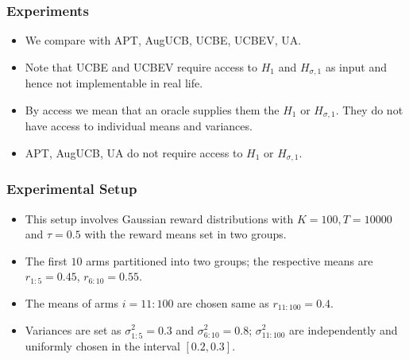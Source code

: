 
\begin{frame}
\frametitle{Experiments}
\begin{itemize}
\item<1-> We compare with APT, AugUCB, UCBE, UCBEV, UA.
\item<2-> Note that UCBE and UCBEV require access to $H_1$ and $H_{\sigma, 1}$ as input and hence not implementable in real life. 
\item<2-> By access we mean that an oracle supplies them the $H_1$ or $H_{\sigma, 1}$. They do not have access to individual means and variances.
\item<3-> APT, AugUCB, UA do not require access to $H_1$ or $H_{\sigma, 1}$.
\end{itemize}
\end{frame}

\begin{frame}
\frametitle{Experimental Setup}
\begin{itemize}
\item<1-> This setup involves Gaussian reward distributions with $K=100, T=10000$ and $\tau=0.5$ with the reward means set in two groups.
\item<2-> The first $10$ arms partitioned into two groups; the respective means are $r_{1:5}=0.45$, $r_{6:10}=0.55$.
\item<3-> The means of arms $i=11:100$ are chosen same as $r_{11:100}=0.4$.
\item<3-> Variances are set as $\sigma_{1:5}^{2}=0.3$ and $\sigma_{6:10}^{2}=0.8$;  $\sigma_{11:100}^{2}$ are independently and uniformly chosen in the interval $[0.2,0.3]$. 
\end{itemize}
\end{frame}


